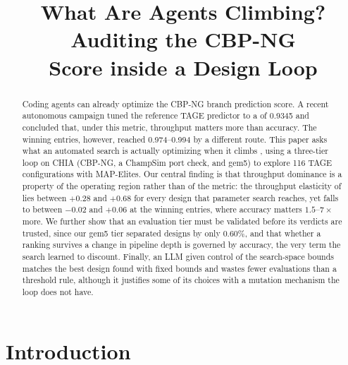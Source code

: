 \documentclass[conference]{IEEEtran}
\newcommand{\vfs}{\text{VFS}}
\begin{document}
\title{What Are Agents Climbing? Auditing the CBP-NG\\Score inside a Design Loop}

\author{
\and
{}
}

\maketitle

\begin{abstract}
Coding agents can already optimize the CBP-NG branch prediction score. A recent
autonomous campaign tuned the reference TAGE predictor to a \vfs{} of 0.9345 and
concluded that, under this metric, throughput matters more than accuracy. The
winning entries, however, reached 0.974--0.994 by a different route. This paper
asks what an automated search is actually optimizing when it climbs \vfs{},
using a three-tier loop on CHIA (CBP-NG, a ChampSim port check, and gem5) to
explore 116 TAGE configurations with MAP-Elites. Our
central finding is that throughput dominance is a property of the operating
region rather than of the metric: the throughput elasticity of \vfs{} lies
between $+0.28$ and $+0.68$ for every design that parameter search reaches, yet
falls to between $-0.02$ and $+0.06$ at the winning entries, where accuracy
matters $1.5$--$7\times$ more. We further show that an evaluation tier must be
validated before its verdicts are trusted, since our gem5 tier separated designs
by only 0.60\%, and that whether a ranking survives a change in pipeline depth
is governed by accuracy, the very term the search learned to discount. Finally,
an LLM given control of the search-space bounds matches the best design found
with fixed bounds and wastes fewer evaluations than a threshold rule, although
it justifies some of its choices with a mutation mechanism the loop does not
have.
\end{abstract}

\section{Introduction}
\end{document}
